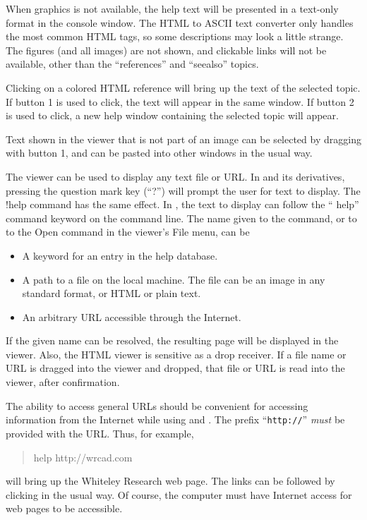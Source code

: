 When graphics is not available, the help text will be presented in a
text-only format in the console window.  The HTML to ASCII text
converter only handles the most common HTML tags, so some
descriptions may look a little strange.  The figures (and all
images) are not shown, and clickable links will not be available,
other than the ``references'' and ``seealso'' topics.

Clicking on a colored HTML reference will bring up the text of the
selected topic.  If button 1 is used to click, the text will appear in
the same window.  If button 2 is used to click, a new help window
containing the selected topic will appear.

Text shown in the viewer that is not part of an image can be selected
by dragging with button 1, and can be pasted into other windows in the
usual way.

The viewer can be used to display any text file or URL.  In {\Xic} and
its derivatives, pressing the question mark key (``{\kb ?}'') will
prompt the user for text to display.  The {\cb !help} command has the
same effect.  In {\WRspice}, the text to display can follow the ``{\cb
help}'' command keyword on the command line.  The name given to the
command, or to to the {\cb Open} command in the viewer's {\cb File}
menu, can be
\begin{itemize}
\item{A keyword for an entry in the help database.}
\item{A path to a file on the local machine.  The file can be an image
in any standard format, or HTML or plain text.}
\item{An arbitrary URL accessible through the Internet.}
\end{itemize}

If the given name can be resolved, the resulting page will be
displayed in the viewer.  Also, the HTML viewer is sensitive as a drop
receiver.  If a file name or URL is dragged into the viewer and
dropped, that file or URL is read into the viewer, after confirmation.

The ability to access general URLs should be convenient for accessing
information from the Internet while using {\Xic} and {\WRspice}.  The
prefix ``{\tt http://}'' {\it must} be provided with the URL.  Thus,
for example,
\begin{quote}\vt
help http://wrcad.com
\end{quote}
will bring up the Whiteley Research web page.  The links can be
followed by clicking in the usual way.  Of course, the computer must
have Internet access for web pages to be accessible.

